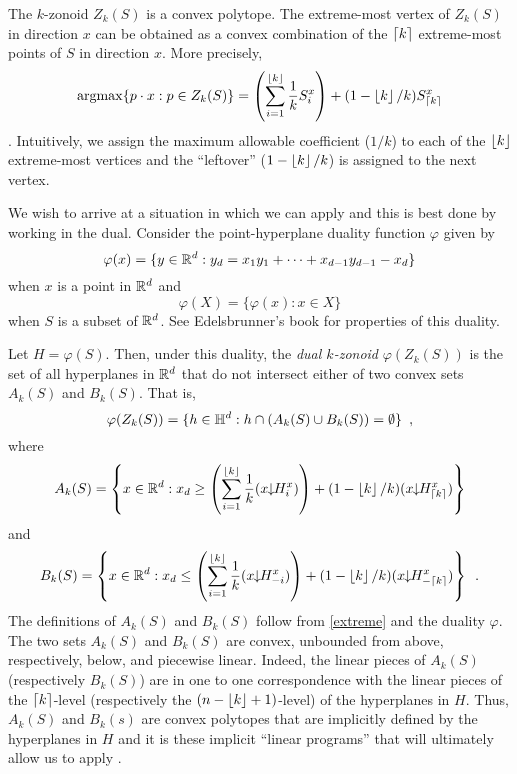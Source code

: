 \documentclass[lotsofwhite]{patmorin}
\newcommand{\argmax}{\mathrm{argmax}}
\newcommand{\drop}{\!\!\downarrow\!\!}
\newcommand{\dual}{\varphi}
\begin{document}
The $k$-zonoid $Z_k(S)$ is a convex polytope.  The extreme-most vertex
of $Z_k(S)$ in direction $x$ can be obtained as a convex combination of the
$\left\lceil k \right\rceil$ extreme-most points of $S$ in direction $x$.  More
precisely,
\begin{equation} 
\argmax\{p\cdot x: p\in Z_k(S)\} =
        \left(\sum_{i=1}^{\floor{k}} \frac{1}{k}S_i^x\right) +
          (1-\floor{k}/k)S_{\ceil{k}}^x  
          \eqlabel{extreme}
\end{equation}
\cite{be01,gm06}.  Intuitively, we assign the maximum allowable
coefficient ($1/k$) to each of the $\left\lfloor k \right\rfloor$ extreme-most vertices
and the ``leftover'' ($1-\left\lfloor k \right\rfloor/k$) is assigned to the next vertex.

We wish to arrive at a situation in which we can apply 
and this is best done by working in the dual.
Consider the point-hyperplane duality function
$\dual$ given by 
\[
    \dual(x)=\{y\in\R^d : y_d = x_1y_1 +\cdots +x_{d-1}y_{d-1} - x_d \}
\] 
when $x$ is a point in $\mathbb{R}^d$ and
\[
     \dual(X) = \{\dual(x) : x\in X\}
\]
when $S$ is a subset of $\mathbb{R}^d$.  See Edelsbrunner's book \cite{e97}
for properties of this duality. 

Let $H=\dual(S)$.  Then,
under this duality, the \emph{dual $k$-zonoid} $\dual(Z_k(S))$ is the set 
of all hyperplanes in $\mathbb{R}^d$
that do not intersect either of two convex sets $A_k(S)$ and $B_k(S)$.
That is,
\[
     \dual(Z_k(S)) = \{ h\in\Hy^d : h\cap(A_k(S)\cup B_k(S)) = \emptyset \} \enspace ,
\]
where
\begin{equation}
   A_k(S) = \left\{x\in\R^d: x_d \ge 
\left(\sum_{i=1}^{\floor{k}} \frac{1}{k}(x\drop H_i^x)\right) +
          (1-\floor{k}/k)(x\drop H_{\ceil{k}}^x) \right\}  \eqlabel{ra}
\end{equation} 
and
\begin{equation}
   B_k(S) = \left\{x\in\R^d: x_d \le 
\left(\sum_{i=1}^{\floor{k}} \frac{1}{k}(x\drop H_{-i}^x)\right) +
          (1-\floor{k}/k)(x\drop H_{-\ceil{k}}^x) \right\} \enspace .
\end{equation}
The definitions of $A_k(S)$ and $B_k(S)$ follow from \eqref{extreme}
and the duality $\dual$.
The two sets $A_k(S)$ and $B_k(S)$ are convex, unbounded from above,
respectively, below, and piecewise linear.  Indeed, the linear pieces
of $A_k(S)$ (respectively $B_k(S)$) are in one to one correspondence
with the linear pieces of the $\left\lceil k \right\rceil$-level (respectively
the $(n-\left\lfloor k \right\rfloor+1)$-level) of the hyperplanes in $H$.  Thus,
$A_k(S)$ and $B_k(s)$ are convex polytopes that are implicitly defined
by the hyperplanes in $H$ and it is these implicit ``linear programs''
that will ultimately allow us to apply .
\end{document}
